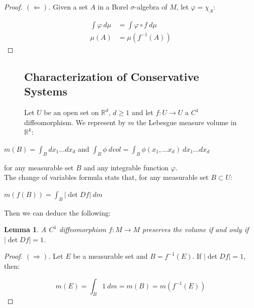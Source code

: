 \documentclass[a4paper,12pt] {article}
\newtheorem{lemma}{Lemma}[section]
\begin{document}
\begin{proof}[Proof. \( (\Leftarrow) \)]Given a set $A$ in a Borel $\sigma$-algebra of $M$, let $\varphi = \chi_A$:

\begin{align*}
    \displaystyle \int \varphi\ d\mu &= \displaystyle \int \varphi \circ f\ d\mu\\[2mm]
    \mu(A) &= \mu(f^{-1}(A))
\end{align*}
\end{proof}

\begin{figure}[h]
\nopagebreak
\subsection{Characterization of Conservative Systems}

Let $U$ be an open set on $\mathbb{R}^d$, $d \geq 1$ and let $f : U \to U$ a $C^1$ diffeomorphism. We represent by $m$ the Lebesgue measure volume in $\mathbb{R}^k$:
\end{figure}

\begin{center}
    $m(B) = \displaystyle \int_B dx_1\dots dx_d$ and $\displaystyle \int_B \phi\ dvol = \displaystyle \int_B \phi(x_1,\dots x_d)\ dx_1\dots dx_d$
\end{center}

\noindent for any measurable set $B$ and any integrable function $\varphi$.\\

 The change of variables formula stats that, for any measurable set $B \subset U$:

\begin{center}
    $m(f(B)) = \displaystyle \int_B |\det Df|\ dm$
\end{center}

 Then we can deduce the following:\\

\begin{lemma}
    A $C^1$ diffeomorphism $f : M \to M$ preserves the volume if and only if $|\det Df| = 1$.
\end{lemma}

\begin{proof}[Proof. \( (\Rightarrow) \)] 
Let $E$ be a measurable set and $B = f^{-1}(E)$. If $|\det Df| = 1$, then:

\[
m(E) = \displaystyle \int_B 1\ dm = m(B) = m(f^{-1}(E))
\]
\end{proof}
\end{document}
